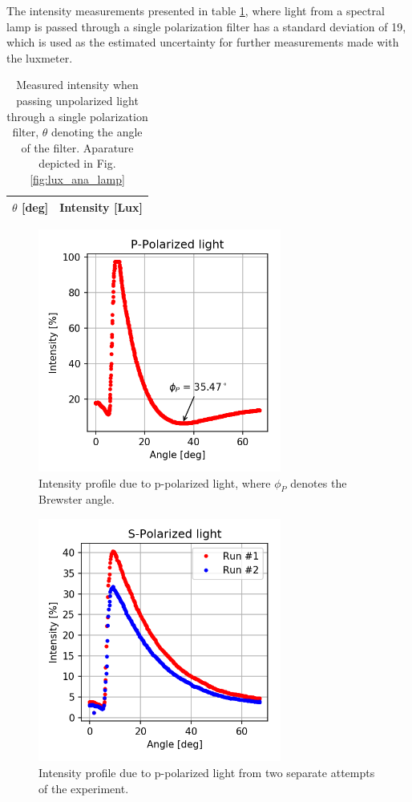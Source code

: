 \documentclass[11pt,a4paper]{article}
\begin{document}
  The intensity measurements presented in table \ref{tab:ana}, where light from a spectral lamp is passed through a single polarization filter has a standard deviation of 19, which is used as the estimated uncertainty for further measurements made with the luxmeter.


  \begin{table}[H]
      \center
      \caption{Measured intensity when passing unpolarized light through a single polarization filter, $\theta$ denoting the angle of the filter. Aparature depicted in Fig. \ref{fig:lux_ana_lamp}}
       \begin{tabular}{r | l}
        $\theta$ [deg] & Intensity [Lux] \\ \hline
         
       \end{tabular}
       \label{tab:ana}
  \end{table}



  \begin{figure}[H]
    \center
    \includegraphics[width=8cm]{scripts/ppolar.png}
    \caption{Intensity profile due to p-polarized light, where $\phi_P$ denotes the Brewster angle.}
  \end{figure}

  \begin{figure}[H]
    \center
    \includegraphics[width=8cm]{scripts/spolar.png}
    \caption{Intensity profile due to p-polarized light from two separate attempts of the experiment.}
  \end{figure}
\end{document}
